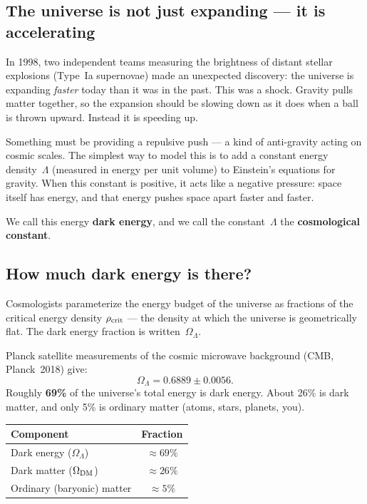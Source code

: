 \documentclass[11pt,a4paper]{article}
\newcommand{\term}[1]{\textbf{#1}}
\newcommand{\OmL}{\Omega_\Lambda}
\begin{document}
\subsection{The universe is not just expanding --- it is accelerating}

In 1998, two independent teams measuring the brightness of distant stellar
explosions (Type~Ia supernovae) made an unexpected discovery: the universe is
expanding \emph{faster} today than it was in the past.
This was a shock.  Gravity pulls matter together, so the expansion should be
slowing down as it does when a ball is thrown upward.  Instead it is speeding
up.

Something must be providing a repulsive push --- a kind of anti-gravity acting
on cosmic scales.  The simplest way to model this is to add a constant energy
density~$\Lambda$ (measured in energy per unit volume) to Einstein's equations
for gravity.  When this constant is positive, it acts like a negative pressure:
space itself has energy, and that energy pushes space apart faster and faster.

We call this energy \term{dark energy}, and we call the constant~$\Lambda$
the \term{cosmological constant}.

\subsection{How much dark energy is there?}

Cosmologists parameterize the energy budget of the universe as fractions of
the critical energy density $\rho_{\rm crit}$ --- the density at which the
universe is geometrically flat.  The dark energy fraction is written~$\OmL$.

Planck satellite measurements of the cosmic microwave background (CMB,
Planck~2018) give:
\[
  \OmL = 0.6889 \pm 0.0056.
\]
Roughly \textbf{69\%} of the universe's total energy is dark energy.  About
26\% is dark matter, and only 5\% is ordinary matter (atoms, stars, planets,
you).

\begin{tcolorbox}[colback=boxorange,colframe=orange!60!black,
  title={Energy budget of the universe}]
\begin{center}
\begin{tabular}{lc}
\toprule
Component & Fraction \\
\midrule
Dark energy ($\Omega_\Lambda$)  & $\approx 69\%$ \\
Dark matter ($\Omega_{\rm DM}$) & $\approx 26\%$ \\
Ordinary (baryonic) matter      & $\approx 5\%$  \\
\bottomrule
\end{tabular}
\end{center}
\end{tcolorbox}
\end{document}
